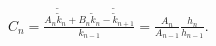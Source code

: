 $C_{n}=\frac{A_{n}\tilde{\tilde{k}}_{n}+B_{n}\tilde{k}_{n}-\tilde{\tilde{k}}_{n%
+1}}{k_{n-1}}=\frac{A_{n}}{A_{n-1}}\frac{h_{n}}{h_{n-1}}.$